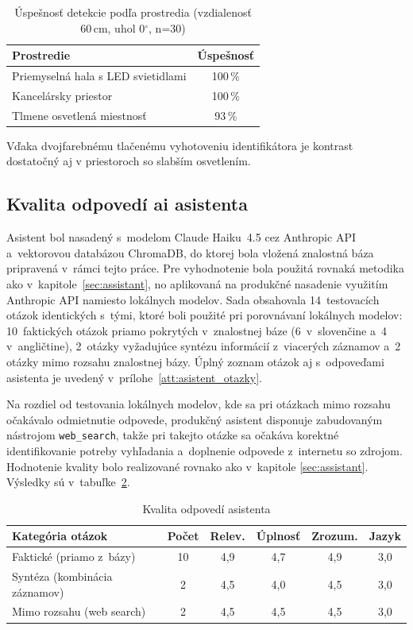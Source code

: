\begin{table}[H]
\centering
\caption{Úspešnosť detekcie podľa prostredia (vzdialenosť 60\,cm, uhol 0$^{\circ}$, n=30)}
\label{tab:test-aruco-svetlo}
\begin{tabular}{|l|c|}
\hline
\textbf{Prostredie} & \textbf{Úspešnosť} \\
\hline
Priemyselná hala s LED svietidlami & 100\,\% \\
Kancelársky priestor & 100\,\% \\
Tlmene osvetlená miestnosť & 93\,\% \\
\hline
\end{tabular}
\end{table}

Vďaka dvojfarebnému tlačenému vyhotoveniu identifikátora je kontrast dostatočný aj v priestoroch so slabším osvetlením.

\subsection{Kvalita odpovedí \acrshort{ai} asistenta}
\label{sec:test-asistent}

Asistent bol nasadený s~modelom Claude Haiku~4.5 cez Anthropic API
a~vektorovou databázou ChromaDB, do ktorej bola vložená znalostná báza
pripravená v~rámci tejto práce. Pre vyhodnotenie bola použitá rovnaká metodika
ako v~kapitole~\ref{sec:assistant}, no aplikovaná na produkčné nasadenie využitím
Anthropic API namiesto lokálnych modelov. Sada obsahovala 14~testovacích
otázok identických s~tými, ktoré boli použité pri porovnávaní lokálnych
modelov: 10~faktických otázok priamo pokrytých v~znalostnej báze (6~v~slovenčine
a~4 v~angličtine), 2~otázky vyžadujúce syntézu informácií z~viacerých záznamov
a~2 otázky mimo rozsahu znalostnej bázy. Úplný zoznam otázok aj s~odpoveďami
asistenta je uvedený v~prílohe~\ref{att:asistent_otazky}.

Na rozdiel od testovania lokálnych modelov, kde sa pri otázkach mimo rozsahu
očakávalo odmietnutie odpovede, produkčný asistent disponuje zabudovaným
nástrojom \texttt{web\_search}, takže pri takejto otázke sa očakáva korektné
identifikovanie potreby vyhľadania a~doplnenie odpovede z~internetu so
zdrojom. Hodnotenie kvality bolo realizované rovnako ako v~kapitole
\ref{sec:assistant}. Výsledky sú v~tabuľke~\ref{tab:test-asistent}.

\begin{table}[H]
\centering
\caption{Kvalita odpovedí asistenta}
\label{tab:test-asistent}
\begin{tabular}{|l|c|c|c|c|c|}
\hline
\textbf{Kategória otázok} & \textbf{Počet} & \textbf{Relev.} & \textbf{Úplnosť} & \textbf{Zrozum.} & \textbf{Jazyk} \\
\hline
Faktické (priamo z~bázy) & 10 & 4{,}9 & 4{,}7 & 4{,}9 & 3{,}0 \\
Syntéza (kombinácia záznamov) & 2 & 4{,}5 & 4{,}0 & 4{,}5 & 3{,}0 \\
Mimo rozsahu (web search) & 2 & 4{,}5 & 4{,}5 & 4{,}5 & 3{,}0 \\
\hline
\end{tabular}
\end{table}

